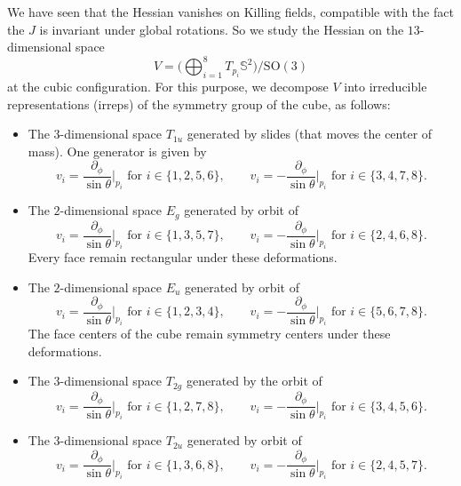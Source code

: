 \documentclass[a4paper]{amsart}
\newcommand{\uS}{\mathbb{S}}
\theoremstyle{plain} %
\theoremstyle{definition} %
\theoremstyle{remark}
\begin{document}
We have seen that the Hessian vanishes on Killing fields, compatible with the
fact the $J$ is invariant under global rotations.  So we study the Hessian on
the $13$-dimensional space
\[
	V = \Big(\bigoplus_{i=1}^8 T_{p_i} \uS^2\Big) / \mathrm{SO}(3)
\]
at the cubic configuration.  For this purpose, we decompose $V$ into
irreducible representations (irreps) of the symmetry group of the cube, as
follows:

\begin{itemize}
	\item The $3$-dimensional space $T_{1u}$ generated by slides (that moves the
		center of mass).  One generator is given by
		\[
			v_i = \frac{\partial_\phi}{\sin\theta}\Big|_{p_i} \text{ for } i \in \{1, 2, 5, 6\},\qquad
			v_i =-\frac{\partial_\phi}{\sin\theta}\Big|_{p_i} \text{ for } i \in \{3, 4, 7, 8\}.
		\]
	\item The $2$-dimensional space $E_g$ generated by orbit of
		\[
			v_i = \frac{\partial_\phi}{\sin\theta}\Big|_{p_i} \text{ for } i \in \{1, 3, 5, 7\},\qquad
			v_i =-\frac{\partial_\phi}{\sin\theta}\Big|_{p_i} \text{ for } i \in \{2, 4, 6, 8\}.
		\]
		Every face remain rectangular under these deformations.
	\item The $2$-dimensional space $E_u$ generated by orbit of
		\[
			v_i = \frac{\partial_\phi}{\sin\theta}\Big|_{p_i} \text{ for } i \in \{1, 2, 3, 4\},\qquad
			v_i =-\frac{\partial_\phi}{\sin\theta}\Big|_{p_i} \text{ for } i \in \{5, 6, 7, 8\}.
		\]
		The face centers of the cube remain symmetry centers under these deformations.
	\item The $3$-dimensional space $T_{2g}$ generated by the orbit of
		\[
			v_i = \frac{\partial_\phi}{\sin\theta}\Big|_{p_i} \text{ for } i \in \{1, 2, 7, 8\},\qquad
			v_i =-\frac{\partial_\phi}{\sin\theta}\Big|_{p_i} \text{ for } i \in \{3, 4, 5, 6\}.
		\]
	\item The $3$-dimensional space $T_{2u}$ generated by orbit of
		\[
			v_i = \frac{\partial_\phi}{\sin\theta}\Big|_{p_i} \text{ for } i \in \{1, 3, 6, 8\},\qquad
			v_i =-\frac{\partial_\phi}{\sin\theta}\Big|_{p_i} \text{ for } i \in \{2, 4, 5, 7\}.
		\]
\end{itemize}
\end{document}

